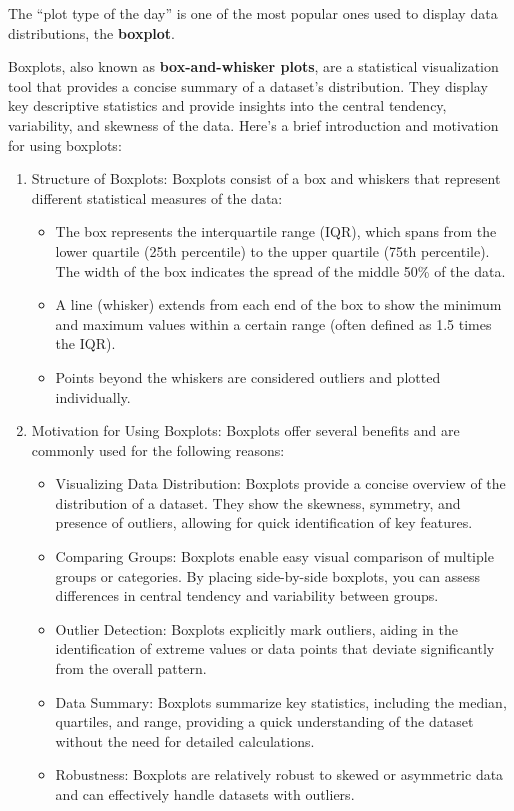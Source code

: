 \documentclass[
  letterpaper,
  DIV=11,
  numbers=noendperiod]{scrreprt}
\providecommand{\tightlist}{%
  \setlength{\itemsep}{0pt}\setlength{\parskip}{0pt}}\usepackage{longtable,booktabs,array}
\begin{document}
The ``plot type of the day'' is one of the most popular ones used to
display data distributions, the \textbf{boxplot}.

Boxplots, also known as \textbf{box-and-whisker plots}, are a
statistical visualization tool that provides a concise summary of a
dataset's distribution. They display key descriptive statistics and
provide insights into the central tendency, variability, and skewness of
the data. Here's a brief introduction and motivation for using boxplots:

\begin{enumerate}
\def\labelenumi{\arabic{enumi}.}
\tightlist
\item
  Structure of Boxplots: Boxplots consist of a box and whiskers that
  represent different statistical measures of the data:

  \begin{itemize}
  \tightlist
  \item
    The box represents the interquartile range (IQR), which spans from
    the lower quartile (25th percentile) to the upper quartile (75th
    percentile). The width of the box indicates the spread of the middle
    50\% of the data.
  \item
    A line (whisker) extends from each end of the box to show the
    minimum and maximum values within a certain range (often defined as
    1.5 times the IQR).
  \item
    Points beyond the whiskers are considered outliers and plotted
    individually.
  \end{itemize}
\item
  Motivation for Using Boxplots: Boxplots offer several benefits and are
  commonly used for the following reasons:

  \begin{itemize}
  \tightlist
  \item
    Visualizing Data Distribution: Boxplots provide a concise overview
    of the distribution of a dataset. They show the skewness, symmetry,
    and presence of outliers, allowing for quick identification of key
    features.
  \item
    Comparing Groups: Boxplots enable easy visual comparison of multiple
    groups or categories. By placing side-by-side boxplots, you can
    assess differences in central tendency and variability between
    groups.
  \item
    Outlier Detection: Boxplots explicitly mark outliers, aiding in the
    identification of extreme values or data points that deviate
    significantly from the overall pattern.
  \item
    Data Summary: Boxplots summarize key statistics, including the
    median, quartiles, and range, providing a quick understanding of the
    dataset without the need for detailed calculations.
  \item
    Robustness: Boxplots are relatively robust to skewed or asymmetric
    data and can effectively handle datasets with outliers.
  \end{itemize}
\end{enumerate}
\end{document}
